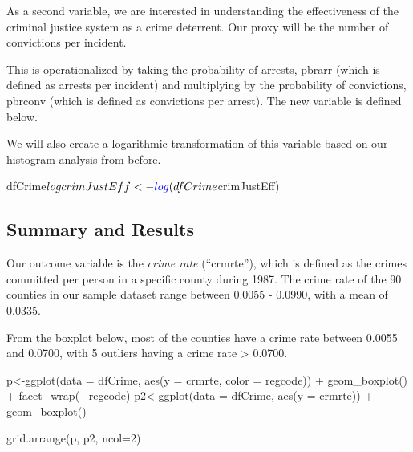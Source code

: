 \documentclass[]{article}
\newenvironment{Shaded}{}{}
\newcommand{\DataTypeTok}[1]{#1}
\newcommand{\DecValTok}[1]{#1}
\newcommand{\KeywordTok}[1]{\textcolor[rgb]{0.00,0.00,1.00}{#1}}
\newcommand{\NormalTok}[1]{#1}
\newcommand{\OperatorTok}[1]{#1}
\newcommand{\StringTok}[1]{\textcolor[rgb]{0.00,0.50,0.50}{#1}}
\begin{document}
As a second variable, we are interested in understanding the
effectiveness of the criminal justice system as a crime deterrent. Our
proxy will be the number of convictions per incident.

This is operationalized by taking the probability of arrests, pbrarr
(which is defined as arrests per incident) and multiplying by the
probability of convictions, pbrconv (which is defined as convictions per
arrest). The new variable is defined below.

\begin{Shaded}
\end{Shaded}

We will also create a logarithmic transformation of this variable based
on our histogram analysis from before.

\begin{Shaded}
\begin{Highlighting}[]
\NormalTok{dfCrime}\OperatorTok{$}\NormalTok{logcrimJustEff<-}\KeywordTok{log}\NormalTok{(dfCrime}\OperatorTok{$}\NormalTok{crimJustEff)}
\end{Highlighting}
\end{Shaded}

\hypertarget{summary-and-results}{%
\subsection{Summary and Results}\label{summary-and-results}}

Our outcome variable is the \emph{crime rate} (``crmrte''), which is
defined as the crimes committed per person in a specific county during
1987. The crime rate of the 90 counties in our sample dataset range
between 0.0055 - 0.0990, with a mean of 0.0335.

From the boxplot below, most of the counties have a crime rate between
0.0055 and 0.0700, with 5 outliers having a crime rate \textgreater{}
0.0700.

\begin{Shaded}
\begin{Highlighting}[]
\NormalTok{p<-}\KeywordTok{ggplot}\NormalTok{(}\DataTypeTok{data =}\NormalTok{ dfCrime, }\KeywordTok{aes}\NormalTok{(}\DataTypeTok{y =}\NormalTok{ crmrte, }\DataTypeTok{color =}\NormalTok{ regcode)) }\OperatorTok{+}\StringTok{ }
\StringTok{     }\KeywordTok{geom_boxplot}\NormalTok{() }\OperatorTok{+}\StringTok{ }\KeywordTok{facet_wrap}\NormalTok{(}\OperatorTok{~}\StringTok{ }\NormalTok{regcode)}
\NormalTok{p2<-}\KeywordTok{ggplot}\NormalTok{(}\DataTypeTok{data =}\NormalTok{ dfCrime, }\KeywordTok{aes}\NormalTok{(}\DataTypeTok{y =}\NormalTok{ crmrte)) }\OperatorTok{+}
\StringTok{     }\KeywordTok{geom_boxplot}\NormalTok{()}

\KeywordTok{grid.arrange}\NormalTok{(p, p2, }\DataTypeTok{ncol=}\DecValTok{2}\NormalTok{)}
\end{Highlighting}
\end{Shaded}
\end{document}
